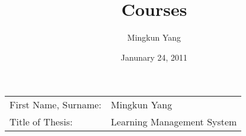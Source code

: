 \documentclass{article}
\begin{document}
\title{Courses}
\author{Mingkun Yang}
\date{Janunary 24, 2011}
\maketitle

	\begin{tabularx}{\textwidth}{X X}
		First Name, Surname: & Mingkun Yang \\
		Title of Thesis:	& Learning Management System
	\end{tabularx}
\end{document}
